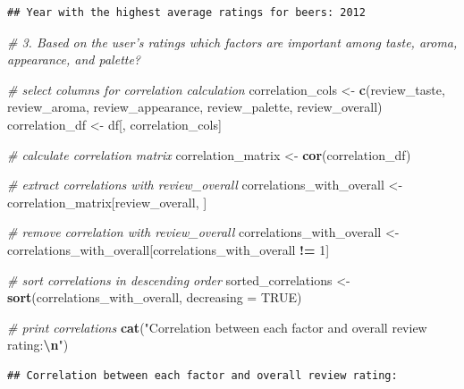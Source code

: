 \documentclass[
  a4paper,
]{article}
\newenvironment{Shaded}{\begin{snugshade}}{\end{snugshade}}
\newcommand{\AttributeTok}[1]{\textcolor[rgb]{0.13,0.29,0.53}{#1}}
\newcommand{\CommentTok}[1]{\textcolor[rgb]{0.56,0.35,0.01}{\textit{#1}}}
\newcommand{\ConstantTok}[1]{\textcolor[rgb]{0.56,0.35,0.01}{#1}}
\newcommand{\DecValTok}[1]{\textcolor[rgb]{0.00,0.00,0.81}{#1}}
\newcommand{\FunctionTok}[1]{\textcolor[rgb]{0.13,0.29,0.53}{\textbf{#1}}}
\newcommand{\NormalTok}[1]{#1}
\newcommand{\OtherTok}[1]{\textcolor[rgb]{0.56,0.35,0.01}{#1}}
\newcommand{\SpecialCharTok}[1]{\textcolor[rgb]{0.81,0.36,0.00}{\textbf{#1}}}
\newcommand{\StringTok}[1]{\textcolor[rgb]{0.31,0.60,0.02}{#1}}
\begin{document}
\begin{verbatim}
## Year with the highest average ratings for beers: 2012
\end{verbatim}

\begin{Shaded}
\begin{Highlighting}[]
\CommentTok{\# 3. Based on the user’s ratings which factors are important among taste, aroma, appearance, and palette?}

\CommentTok{\# select columns for correlation calculation}
\NormalTok{correlation\_cols }\OtherTok{\textless{}{-}} \FunctionTok{c}\NormalTok{(}\StringTok{\textquotesingle{}review\_taste\textquotesingle{}}\NormalTok{, }\StringTok{\textquotesingle{}review\_aroma\textquotesingle{}}\NormalTok{, }\StringTok{\textquotesingle{}review\_appearance\textquotesingle{}}\NormalTok{, }\StringTok{\textquotesingle{}review\_palette\textquotesingle{}}\NormalTok{, }\StringTok{\textquotesingle{}review\_overall\textquotesingle{}}\NormalTok{)}
\NormalTok{correlation\_df }\OtherTok{\textless{}{-}}\NormalTok{ df[, correlation\_cols]}

\CommentTok{\# calculate correlation matrix}
\NormalTok{correlation\_matrix }\OtherTok{\textless{}{-}} \FunctionTok{cor}\NormalTok{(correlation\_df)}

\CommentTok{\# extract correlations with review\_overall}
\NormalTok{correlations\_with\_overall }\OtherTok{\textless{}{-}}\NormalTok{ correlation\_matrix[}\StringTok{\textquotesingle{}review\_overall\textquotesingle{}}\NormalTok{, ]}

\CommentTok{\# remove correlation with review\_overall}
\NormalTok{correlations\_with\_overall }\OtherTok{\textless{}{-}}\NormalTok{ correlations\_with\_overall[correlations\_with\_overall }\SpecialCharTok{!=} \DecValTok{1}\NormalTok{]}

\CommentTok{\# sort correlations in descending order}
\NormalTok{sorted\_correlations }\OtherTok{\textless{}{-}} \FunctionTok{sort}\NormalTok{(correlations\_with\_overall, }\AttributeTok{decreasing =} \ConstantTok{TRUE}\NormalTok{)}

\CommentTok{\# print correlations}
\FunctionTok{cat}\NormalTok{(}\StringTok{"Correlation between each factor and overall review rating:}\SpecialCharTok{\textbackslash{}n}\StringTok{"}\NormalTok{)}
\end{Highlighting}
\end{Shaded}

\begin{verbatim}
## Correlation between each factor and overall review rating:
\end{verbatim}
\end{document}
